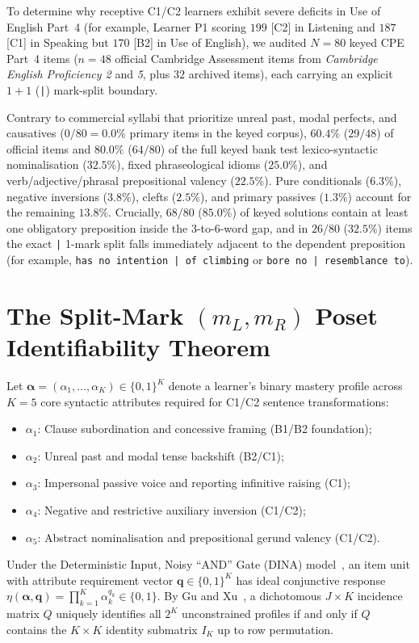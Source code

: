 \documentclass[11pt,reqno]{article}
\begin{document}
To determine why receptive C1/C2 learners exhibit severe deficits in Use of English Part~4 (for example, Learner P1 scoring $199$ [C2] in Listening and $187$ [C1] in Speaking but $170$ [B2] in Use of English), we audited $N=80$ keyed CPE Part~4 items ($n=48$ official Cambridge Assessment items from \emph{Cambridge English Proficiency 2} and \emph{5}, plus $32$ archived items), each carrying an explicit $1+1$ (\texttt{|}) mark-split boundary.

Contrary to commercial syllabi that prioritize unreal past, modal perfects, and causatives ($0/80 = 0.0\%$ primary items in the keyed corpus), $60.4\%$ ($29/48$) of official items and $80.0\%$ ($64/80$) of the full keyed bank test lexico-syntactic nominalisation ($32.5\%$), fixed phraseological idioms ($25.0\%$), and verb/adjective/phrasal prepositional valency ($22.5\%$). Pure conditionals ($6.3\%$), negative inversions ($3.8\%$), clefts ($2.5\%$), and primary passives ($1.3\%$) account for the remaining $13.8\%$. Crucially, $68/80$ ($85.0\%$) of keyed solutions contain at least one obligatory preposition inside the 3-to-6-word gap, and in $26/80$ ($32.5\%$) items the exact \texttt{|} 1-mark split falls immediately adjacent to the dependent preposition (for example, \texttt{has no intention | of climbing} or \texttt{bore no | resemblance to}).

\section{The Split-Mark $(m_L, m_R)$ Poset Identifiability Theorem}\label{sec:psychometrics}

Let $\boldsymbol{\alpha} = (\alpha_1, \dots, \alpha_K) \in \{0,1\}^K$ denote a learner's binary mastery profile across $K=5$ core syntactic attributes required for C1/C2 sentence transformations:
\begin{itemize}
    \item $\alpha_1$: Clause subordination and concessive framing (B1/B2 foundation);
    \item $\alpha_2$: Unreal past and modal tense backshift (B2/C1);
    \item $\alpha_3$: Impersonal passive voice and reporting infinitive raising (C1);
    \item $\alpha_4$: Negative and restrictive auxiliary inversion (C1/C2);
    \item $\alpha_5$: Abstract nominalisation and prepositional gerund valency (C1/C2).
\end{itemize}
Under the Deterministic Input, Noisy ``AND'' Gate (DINA) model~\cite{DeLaTorre2009}, an item unit with attribute requirement vector $\mathbf{q} \in \{0,1\}^K$ has ideal conjunctive response $\eta(\boldsymbol{\alpha}, \mathbf{q}) = \prod_{k=1}^K \alpha_k^{q_k} \in \{0,1\}$. By Gu and Xu~\cite{GuXu2019}, a dichotomous $J \times K$ incidence matrix $Q$ uniquely identifies all $2^K$ unconstrained profiles if and only if $Q$ contains the $K\times K$ identity submatrix $I_K$ up to row permutation.
\end{document}
